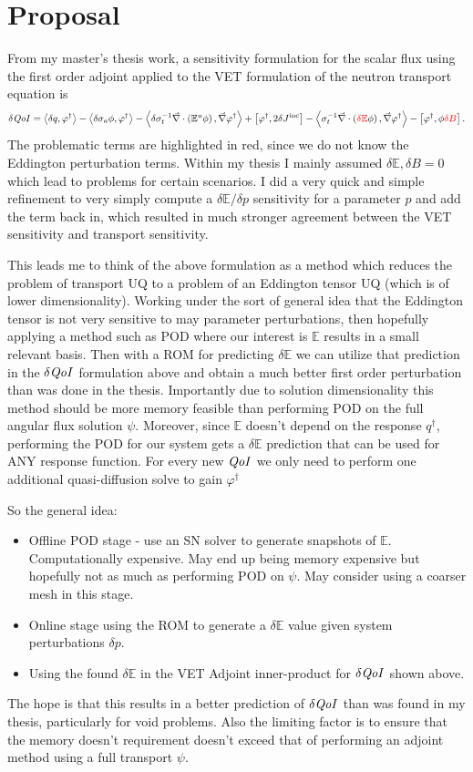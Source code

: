 \documentclass{article}
\newcommand{\bra}{\left\langle}
\newcommand{\ket}{\right\rangle}
\newcommand{\sbra}{\left[}
\newcommand{\sket}{\right]}
\renewcommand{\div}{\vec{\nabla} \cdot}
\newcommand{\grad}{\vec{\nabla}}
\newcommand{\vefadj}{\varphi^\dag}
\newcommand{\Edd}{\mathbb{E}}
\newcommand{\BEdd}{B}
\newcommand{\siga}{\sigma_a}
\newcommand{\isigt}{\sigma_t^{-1}}
\newcommand{\scalSource}{q}
\newcommand{\qoi}{{\it QoI}\xspace}
\newcommand{\tcr}[1]{\textcolor{red}{#1}}
\begin{document}
\section{Proposal}
From my master's thesis work, a sensitivity formulation for the scalar flux using the first order adjoint applied to the VET formulation of the neutron transport equation is
\begin{equation}
\delta \qoi = \bra \delta \scalSource, \vefadj  \ket - \bra \delta \siga \phi, \vefadj \ket  - \bra \delta \isigt \div \left( \Edd^u \phi \right) , \grad \vefadj \ket + \sbra \vefadj, 2 \delta J^{\text{inc}} \sket - \bra  \isigt \div \left( \tcr{\delta \Edd} \phi \right), \grad \vefadj \ket
- \sbra \vefadj, \phi \tcr{\delta \BEdd} \sket .
\end{equation}
The problematic terms are highlighted in red, since we do not know the Eddington perturbation terms. Within my thesis I mainly assumed $\delta \Edd,\delta \BEdd=0$ which lead to problems for certain scenarios. I did a very quick and simple refinement to very simply compute a $\delta \Edd/ \delta p$ sensitivity for a parameter $p$ and add the term back in, which resulted in much stronger agreement between the VET sensitivity and transport sensitivity.

This leads me to think of the above formulation as a method which reduces the problem of transport UQ to a problem of an Eddington tensor UQ (which is of lower dimensionality). Working under the sort of general idea that the Eddington tensor is not very sensitive to may parameter perturbations, then hopefully applying a method such as POD where our interest is $\Edd$ results in a small relevant basis. Then with a ROM for predicting $\delta \Edd$ we can utilize that prediction in the $\delta \qoi$ formulation above and obtain a much better first order perturbation than was done in the thesis. Importantly due to solution dimensionality this method should be more memory feasible than performing POD on the full angular flux solution $\psi$. Moreover, since $\Edd$ doesn't depend on the response $q^\dag$, performing the POD for our system gets a $\delta \Edd$ prediction that can be used for ANY response function. For every new $\qoi$ we only need to perform one additional quasi-diffusion solve to gain $\vefadj$

So the general idea:
\begin{itemize}
\item Offline POD stage - use an SN solver to generate snapshots of $\Edd$. Computationally expensive. May end up being memory expensive but hopefully not as much as performing POD on $\psi$. May consider using a coarser mesh in this stage.
\item Online stage using the ROM to generate a $\delta \Edd$ value given system perturbations $\delta p$.
\item Using the found $\delta \Edd$ in the VET Adjoint inner-product for $\delta \qoi$ shown above.
\end{itemize}

The hope is that this results in a better prediction of $\delta \qoi$ than was found in my thesis, particularly for void problems. Also the limiting factor is to ensure that the memory doesn't requirement doesn't exceed that of performing an adjoint method using a full transport $\psi$.
\end{document}
